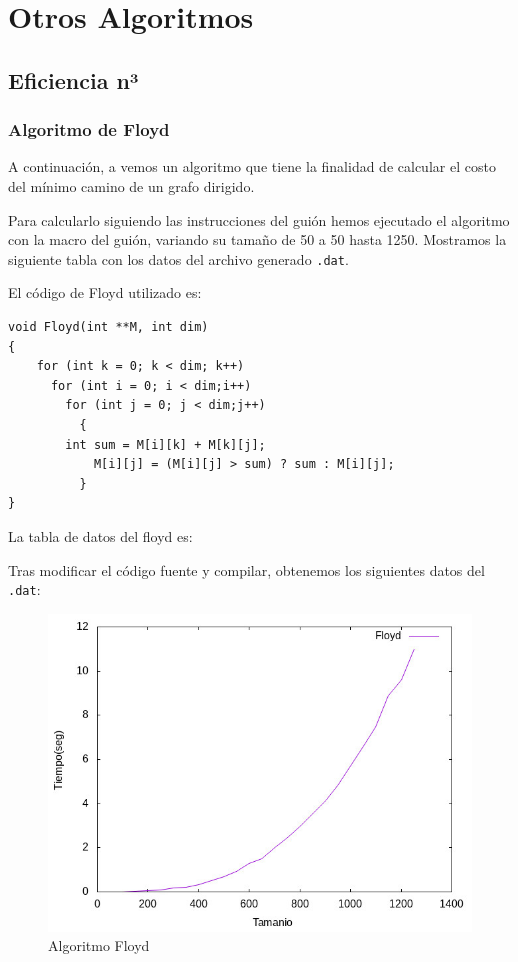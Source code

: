 \documentclass[12pt, spanish]{article}
\def\code#1{\texttt{#1}}
\begin{document}
\section{Otros Algoritmos}

\subsection{Eficiencia n³}

\subsubsection{Algoritmo de Floyd}
A continuación, a vemos un algoritmo que tiene la finalidad de calcular el costo del mínimo camino de un grafo dirigido.

Para calcularlo siguiendo las instrucciones del guión hemos ejecutado el algoritmo con la macro del guión, variando su tamaño de 50 a 50 hasta 1250. Mostramos la siguiente tabla con los datos del archivo generado \code{.dat}.

\newpage

El código de Floyd utilizado es:

\begin{verbatim}
void Floyd(int **M, int dim)
{
	for (int k = 0; k < dim; k++)
	  for (int i = 0; i < dim;i++)
	    for (int j = 0; j < dim;j++)
	      {
		int sum = M[i][k] + M[k][j];
	    	M[i][j] = (M[i][j] > sum) ? sum : M[i][j];
	      }
}
\end{verbatim}


La tabla de datos del floyd es:


Tras modificar el código fuente y compilar, obtenemos los siguientes datos del \code{.dat}:

\begin{figure}[H]
  \centering
  \includegraphics[scale = 1]{floyd.png}
  \caption{Algoritmo Floyd}
\end{figure}
\end{document}
